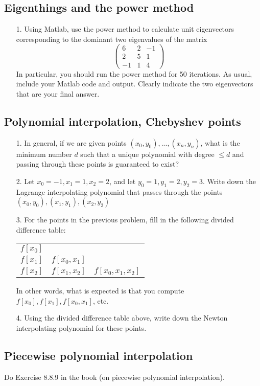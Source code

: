 \documentclass{article}
\begin{document}
\subsection{Eigenthings and the power method}
\begin{itemize}
    \item[1.] Using Matlab, use the power method to calculate unit eigenvectors corresponding to the dominant two eigenvalues of the matrix
    \[\begin{pmatrix} 6 & 2 & -1 \\ 2 & 5 & 1 \\ -1 & 1 & 4 \end{pmatrix}\]
    In particular, you should run the power method for 50 iterations. As usual, include your Matlab code and output. Clearly indicate the two eigenvectors that are your final answer.
\end{itemize}

\subsection{Polynomial interpolation, Chebyshev points}
\begin{itemize}
    \item[1.] In general, if we are given points $(x_0, y_0), ...,(x_n, y_n)$, what is the minimum number $d$ such that a unique polynomial with degree $\leq d$ and passing through these points is guaranteed to exist?
    \item[2.] Let $x_0 = −1, x_1 = 1, x_2 = 2$, and let $y_0 = 1, y_1 = 2, y_2 = 3$. Write down the Lagrange interpolating polynomial that passes through the points $(x_0, y_0),(x_1, y_1),(x_2, y_2)$
    \item[3.] For the points in the previous problem, fill in the following divided difference table:
    \begin{center}
        \begin{tabular}{ |c|c|c| } 
         \hline
         $f[x_0]$ &  &  \\ 
         $f[x_1]$ & $f[x_0, x_1]$ &  \\ 
         $f[x_2]$ & $f[x_1, x_2]$ & $f[x_0, x_1, x_2]$ \\ 
         \hline
        \end{tabular}
    \end{center}
    In other words, what is expected is that you compute $f[x_0], f[x_1], f[x_0, x_1]$, etc.
    \item[4.] Using the divided difference table above, write down the Newton interpolating polynomial for these points.
\end{itemize}

\subsection{Piecewise polynomial interpolation}
Do Exercise 8.8.9 in the book (on piecewise polynomial interpolation).
\end{document}
